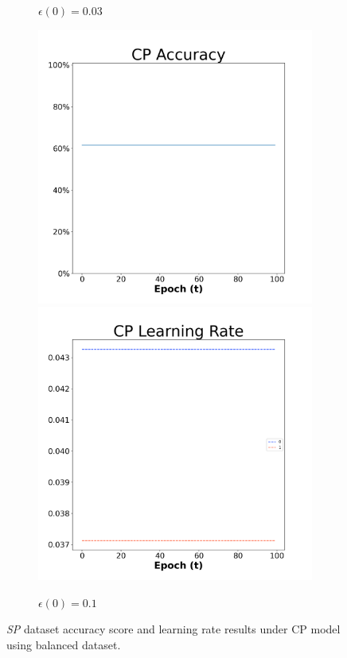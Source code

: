 \begin{figure}[H]
\begin{subfigure}{0.3\textwidth}
  \caption{$\epsilon(0)=0.03$}
\end{subfigure}\hfil %
\begin{subfigure}{0.3\textwidth}
  \includegraphics[width=\linewidth]{images/exper1/SP/CP_0.1_acc.png}
  \includegraphics[width=\linewidth]{images/exper1/SP/CP_0.1_lr.png}
  \caption{$\epsilon(0)=0.1$}
\end{subfigure}

\caption{\textit{SP} dataset accuracy score and learning rate results under CP model using balanced dataset.}
\end{figure}


